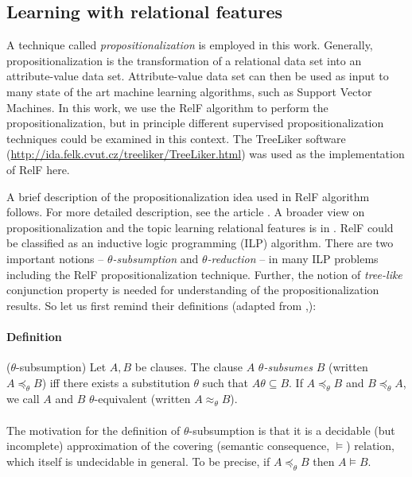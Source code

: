 \documentclass[11pt,twoside,a4paper]{book}
\newcounter{Definition}
\begin{document}
\subsection{Learning with relational features}
A technique called \emph{propositionalization} is employed in this work. 
Generally, propositionalization is the transformation of a relational data set
into an attribute-value data set.
Attribute-value data set can then be used as input to many
state of the art machine learning algorithms, such as 
Support Vector Machines.
In this work, we use the RelF algorithm to perform the propositionalization,
but in principle different supervised propositionalization
techniques could be examined in this context.
The TreeLiker software (\url{http://ida.felk.cvut.cz/treeliker/TreeLiker.html})
was used as the implementation of RelF here.

A brief description of the propositionalization idea used in RelF algorithm follows.
For more detailed description, see the article \cite{relf}.
A broader view on propositionalization and the topic learning relational features is in \cite{kuzelka}.
RelF could be classified as an inductive logic programming (ILP) algorithm.
There are two important notions -- \emph{$\theta$-subsumption} and \emph{$\theta$-reduction} --
in many ILP problems including the RelF propositionalization technique.
Further, the notion of \emph{tree-like} conjunction property is needed 
for understanding of the propositionalization results.
So let us first remind their definitions (adapted from \cite{szabova},\cite{relf}): 

\paragraph{Definition} ($\theta$-subsumption) Let $A,B$ be clauses. 
The clause $A$ \emph{$\theta$-subsumes} $B$ (written $A \preceq_{\theta} B$)
iff there exists a substitution $\theta$ such that $ A \theta \subseteq B$.
If $A \preceq_{\theta} B$ and $B \preceq_{\theta} A$, we call $A$ and $B$ 
$\theta$-equivalent (written $A \approx_{\theta} B$).

\paragraph{ } The motivation for the definition of $\theta$-subsumption is that it is a decidable
(but incomplete) approximation of the covering (semantic consequence, $\vDash$) relation,
which itself is undecidable in general.
To be precise, if $A \preceq_{\theta} B$ then $A \vDash B$. \cite{plotkin}
\end{document}
